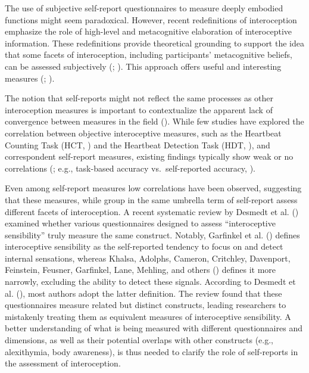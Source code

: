 \documentclass[
  man,
  floatsintext,
  longtable,
  nolmodern,
  notxfonts,
  notimes,
  colorlinks=true,linkcolor=blue,citecolor=blue,urlcolor=blue]{apa7}
\begin{document}
The use of subjective self-report questionnaires to measure deeply
embodied functions might seem paradoxical. However, recent redefinitions
of interoception emphasize the role of high-level and metacognitive
elaboration of interoceptive information. These redefinitions provide
theoretical grounding to support the idea that some facets of
interoception, including participants' metacognitive beliefs, can be
assessed subjectively (;
). This
approach offers useful and interesting measures
(;
).

The notion that self-reports might not reflect the same processes as
other interoception measures is important to contextualize the apparent
lack of convergence between measures in the field
(). While few
studies have explored the correlation between objective interoceptive
measures, such as the Heartbeat Counting Task (HCT,
) and the Heartbeat
Detection Task (HDT, ), and correspondent self-report measures, existing
findings typically show weak or no correlations
(; e.g., task-based accuracy
vs.~self-reported accuracy, ).

Even among self-report measures low correlations have been observed,
suggesting that these measures, while group in the same umbrella term of
self-report assess different facets of interoception. A recent
systematic review by Desmedt et al.
() examined whether various
questionnaires designed to assess ``interoceptive sensibility'' truly
measure the same construct. Notably, Garfinkel et al.
() defines interoceptive
sensibility as the self-reported tendency to focus on and detect
internal sensations, whereas Khalsa, Adolphs, Cameron, Critchley,
Davenport, Feinstein, Feusner, Garfinkel, Lane, Mehling, and others
() defines it more narrowly,
excluding the ability to detect these signals. According to Desmedt et
al. (), most authors adopt the
latter definition. The review found that these questionnaires measure
related but distinct constructs, leading researchers to mistakenly
treating them as equivalent measures of interoceptive sensibility. A
better understanding of what is being measured with different
questionnaires and dimensions, as well as their potential overlaps with
other constructs (e.g., alexithymia, body awareness), is thus needed to
clarify the role of self-reports in the assessment of interoception.
\end{document}
